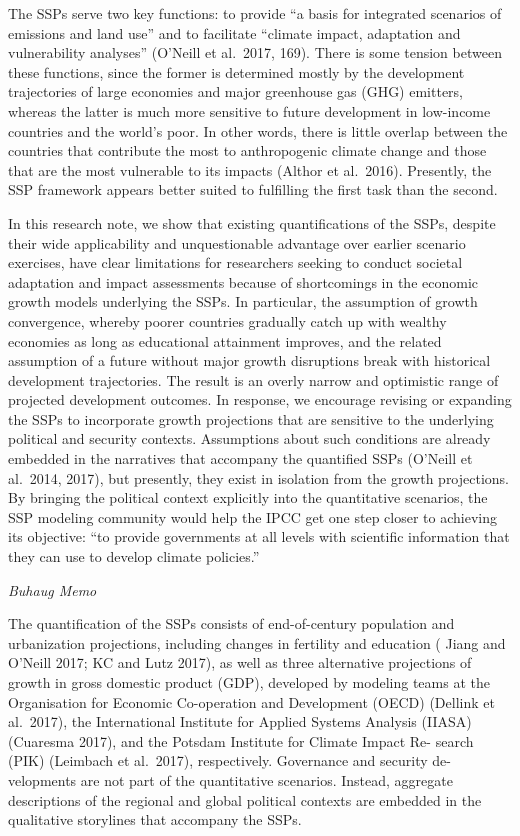 \documentclass[
]{book}
\begin{document}
The SSPs serve two key functions: to provide ``a basis for integrated scenarios of emissions and land use'' and to facilitate ``climate impact, adaptation and vulnerability analyses'' (O'Neill et al.~2017, 169). There is some tension between these functions, since the former is determined mostly by the development trajectories of large economies and major greenhouse gas (GHG) emitters, whereas the latter is much more sensitive to future development in low-income countries and the world's poor. In other words, there is little overlap between the countries that contribute the most to anthropogenic climate change and those that are the most vulnerable to its impacts (Althor et al.~2016). Presently, the SSP framework appears better suited to fulfilling the first task than the second.

In this research note, we show that existing quantifications of the SSPs, despite their wide applicability and unquestionable advantage over earlier scenario exercises, have clear limitations for researchers seeking to conduct societal adaptation and impact assessments because of shortcomings in the economic growth models underlying the SSPs. In particular, the assumption of growth convergence, whereby poorer countries gradually catch up with wealthy economies as long as educational attainment improves, and the related assumption of a future without major growth disruptions break with historical development trajectories. The result is an overly narrow and optimistic range of projected development outcomes. In response, we encourage revising or expanding the SSPs to incorporate growth projections that are sensitive to the underlying political and security contexts. Assumptions about such conditions are already embedded in the narratives that accompany the quantified SSPs (O'Neill et al.~2014, 2017), but presently, they exist in isolation from the growth projections. By bringing the political context explicitly into the quantitative scenarios, the SSP modeling community would help the IPCC get one step closer to achieving its objective: ``to provide governments at all levels with scientific information that they can use to develop climate policies.''

\emph{Buhaug Memo}

The quantiﬁcation of the SSPs consists of end-of-century population and
urbanization projections, including changes in fertility and education ( Jiang
and O'Neill 2017; KC and Lutz 2017), as well as three alternative projections
of growth in gross domestic product (GDP), developed by modeling teams
at the Organisation for Economic Co-operation and Development (OECD)
(Dellink et al.~2017), the International Institute for Applied Systems Analysis
(IIASA) (Cuaresma 2017), and the Potsdam Institute for Climate Impact Re-
search (PIK) (Leimbach et al.~2017), respectively. Governance and security de-
velopments are not part of the quantitative scenarios. Instead, aggregate
descriptions of the regional and global political contexts are embedded in the
qualitative storylines that accompany the SSPs.
\end{document}
